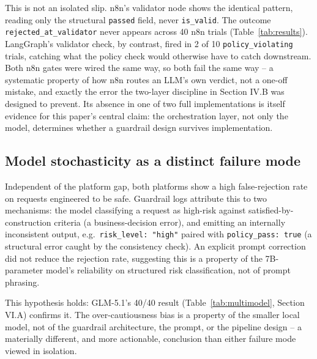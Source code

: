 \documentclass[conference]{IEEEtran}
\begin{document}
This is not an isolated slip. n8n's validator node shows the identical pattern, reading only the structural \texttt{passed} field, never \texttt{is\_valid}. The outcome \texttt{rejected\_at\_validator} never appears across 40 n8n trials (Table~\ref{tab:results}). LangGraph's validator check, by contrast, fired in 2 of 10 \texttt{policy\_violating} trials, catching what the policy check would otherwise have to catch downstream. Both n8n gates were wired the same way, so both fail the same way -- a systematic property of how n8n routes an LLM's own verdict, not a one-off mistake, and exactly the error the two-layer discipline in Section IV.B was designed to prevent. Its absence in one of two full implementations is itself evidence for this paper's central claim: the orchestration layer, not only the model, determines whether a guardrail design survives implementation.

\subsection{Model stochasticity as a distinct failure mode}
Independent of the platform gap, both platforms show a high false-rejection rate on requests engineered to be safe. Guardrail logs attribute this to two mechanisms: the model classifying a request as high-risk against satisfied-by-construction criteria (a business-decision error), and emitting an internally inconsistent output, e.g.\ \texttt{risk\_level: "high"} paired with \texttt{policy\_pass: true} (a structural error caught by the consistency check). An explicit prompt correction did not reduce the rejection rate, suggesting this is a property of the 7B-parameter model's reliability on structured risk classification, not of prompt phrasing.

This hypothesis holds: GLM-5.1's 40/40 result (Table~\ref{tab:multimodel}, Section VI.A) confirms it. The over-cautiousness bias is a property of the smaller local model, not of the guardrail architecture, the prompt, or the pipeline design -- a materially different, and more actionable, conclusion than either failure mode viewed in isolation.
\end{document}
